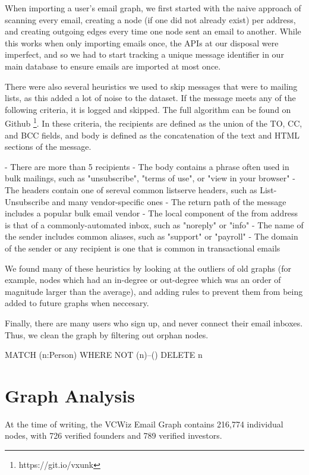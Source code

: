 When importing a user's email graph, we first started with the naive approach of scanning every email, creating a node (if one did not already exist) per address, and creating outgoing edges every time one node sent an email to another. While this works when only importing emails once, the APIs at our disposal were imperfect, and so we had to start tracking a unique message identifier in our main database to ensure emails are imported at most once.

There were also several heuristics we used to skip messages that were to mailing lists, as this added a lot of noise to the dataset. If the message meets any of the following criteria, it is logged and skipped. The full algorithm can be found on Github \footnote{https://git.io/vxunk}. In these criteria, the recipients are defined as the union of the TO, CC, and BCC fields, and body is defined as the concatenation of the text and HTML sections of the message.

- There are more than 5 recipients
- The body contains a phrase often used in bulk mailings, such as "unsubscribe", "terms of use", or "view in your browser"
- The headers contain one of sereval common listserve headers, such as List-Unsubscribe and many vendor-specific ones
- The return path of the message includes a popular bulk email vendor
- The local component of the from address is that of a commonly-automated inbox, such as "noreply" or "info"
- The name of the sender includes common aliases, such as "support" or "payroll"
- The domain of the sender or any recipient is one that is common in transactional emails

We found many of these heuristics by looking at the outliers of old graphs (for example, nodes which had an in-degree or out-degree which was an order of magnitude larger than the average), and adding rules to prevent them from being added to future graphs when neccesary.

Finally, there are many users who sign up, and never connect their email inboxes. Thus, we clean the graph by filtering out orphan nodes.

MATCH (n:Person)
WHERE NOT (n)--()
DELETE n

\section{Graph Analysis}

At the time of writing, the VCWiz Email Graph contains 216,774 individual nodes, with 726 verified founders and 789 verified investors.

